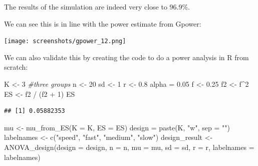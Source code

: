\documentclass[
]{book}
\newenvironment{Shaded}{\begin{snugshade}}{\end{snugshade}}
\newcommand{\AttributeTok}[1]{\textcolor[rgb]{0.77,0.63,0.00}{#1}}
\newcommand{\CommentTok}[1]{\textcolor[rgb]{0.56,0.35,0.01}{\textit{#1}}}
\newcommand{\DecValTok}[1]{\textcolor[rgb]{0.00,0.00,0.81}{#1}}
\newcommand{\FloatTok}[1]{\textcolor[rgb]{0.00,0.00,0.81}{#1}}
\newcommand{\FunctionTok}[1]{\textcolor[rgb]{0.00,0.00,0.00}{#1}}
\newcommand{\NormalTok}[1]{#1}
\newcommand{\OtherTok}[1]{\textcolor[rgb]{0.56,0.35,0.01}{#1}}
\newcommand{\SpecialCharTok}[1]{\textcolor[rgb]{0.00,0.00,0.00}{#1}}
\newcommand{\StringTok}[1]{\textcolor[rgb]{0.31,0.60,0.02}{#1}}
\begin{document}
The results of the simulation are indeed very close to 96.9\%.
\newpage

We can see this is in line with the power estimate from Gpower:

\texttt{[image: screenshots/gpower\_12.png]}

\newpage

We can also validate this by creating the code to do a power analysis in R from scratch:

\begin{Shaded}
\begin{Highlighting}[]
\NormalTok{K }\OtherTok{\textless{}{-}} \DecValTok{3} \CommentTok{\#three groups}
\NormalTok{n }\OtherTok{\textless{}{-}} \DecValTok{20}
\NormalTok{sd }\OtherTok{\textless{}{-}} \DecValTok{1}
\NormalTok{r }\OtherTok{\textless{}{-}} \FloatTok{0.8}
\NormalTok{alpha }\OtherTok{=} \FloatTok{0.05}
\NormalTok{f }\OtherTok{\textless{}{-}} \FloatTok{0.25}
\NormalTok{f2 }\OtherTok{\textless{}{-}}\NormalTok{ f}\SpecialCharTok{\^{}}\DecValTok{2}
\NormalTok{ES }\OtherTok{\textless{}{-}}\NormalTok{ f2 }\SpecialCharTok{/}\NormalTok{ (f2 }\SpecialCharTok{+} \DecValTok{1}\NormalTok{)}
\NormalTok{ES}
\end{Highlighting}
\end{Shaded}

\begin{verbatim}
## [1] 0.05882353
\end{verbatim}

\begin{Shaded}
\begin{Highlighting}[]
\NormalTok{mu }\OtherTok{\textless{}{-}} \FunctionTok{mu\_from\_ES}\NormalTok{(}\AttributeTok{K =}\NormalTok{ K, }\AttributeTok{ES =}\NormalTok{ ES)}
\NormalTok{design }\OtherTok{=} \FunctionTok{paste}\NormalTok{(K, }\StringTok{"w"}\NormalTok{, }\AttributeTok{sep =} \StringTok{""}\NormalTok{)}
\NormalTok{labelnames }\OtherTok{\textless{}{-}} \FunctionTok{c}\NormalTok{(}\StringTok{"speed"}\NormalTok{, }\StringTok{"fast"}\NormalTok{, }\StringTok{"medium"}\NormalTok{, }\StringTok{"slow"}\NormalTok{)}
\NormalTok{design\_result }\OtherTok{\textless{}{-}} \FunctionTok{ANOVA\_design}\NormalTok{(}\AttributeTok{design =}\NormalTok{ design,}
                   \AttributeTok{n =}\NormalTok{ n, }
                   \AttributeTok{mu =}\NormalTok{ mu, }
                   \AttributeTok{sd =}\NormalTok{ sd, }
                   \AttributeTok{r =}\NormalTok{ r, }
                   \AttributeTok{labelnames =}\NormalTok{ labelnames)}
\end{Highlighting}
\end{Shaded}
\end{document}
